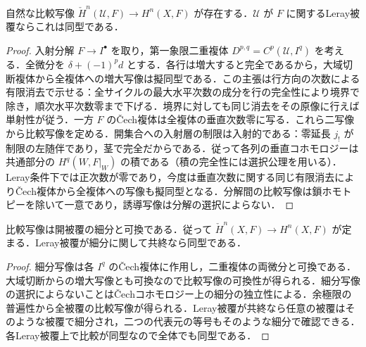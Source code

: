 \begin{prop}[Čech比較写像とLerayの定理]
自然な比較写像 $\check H^n(\mathcal U,F)\to H^n(X,F)$ が存在する．$\mathcal U$ が $F$ に関するLeray被覆ならこれは同型である．
\end{prop}
\begin{proof}
入射分解 $F\to I^\bullet$ を取り，第一象限二重複体 $D^{p,q}=C^p(\mathcal U,I^q)$ を考える．全微分を $\delta+(-1)^p d$ とする．各行は増大すると完全であるから，大域切断複体から全複体への増大写像は擬同型である．この主張は行方向の次数による有限消去で示せる：全サイクルの最大水平次数の成分を行の完全性により境界で除き，順次水平次数零まで下げる．境界に対しても同じ消去をその原像に行えば単射性が従う．一方 $F$ のČech複体は全複体の垂直次数零に写る．これら二写像から比較写像を定める．開集合への入射層の制限は入射的である：零延長 $j_!$ が制限の左随伴であり，茎で完全だからである．従って各列の垂直コホモロジーは共通部分の $H^q(W,F|_W)$ の積である（積の完全性には選択公理を用いる）．Leray条件下では正次数が零であり，今度は垂直次数に関する同じ有限消去によりČech複体から全複体への写像も擬同型となる．分解間の比較写像は鎖ホモトピーを除いて一意であり，誘導写像は分解の選択によらない．
\end{proof}
\begin{prop}[比較写像と細分]
比較写像は開被覆の細分と可換である．従って $\check H^n(X,F)\to H^n(X,F)$ が定まる．Leray被覆が細分に関して共終なら同型である．
\end{prop}
\begin{proof}
細分写像は各 $I^q$ のČech複体に作用し，二重複体の両微分と可換である．大域切断からの増大写像とも可換なので比較写像の可換性が得られる．細分写像の選択によらないことはČechコホモロジー上の細分の独立性による．余極限の普遍性から全被覆の比較写像が得られる．Leray被覆が共終なら任意の被覆はそのような被覆で細分され，二つの代表元の等号もそのような細分で確認できる．各Leray被覆上で比較が同型なので全体でも同型である．
\end{proof}
